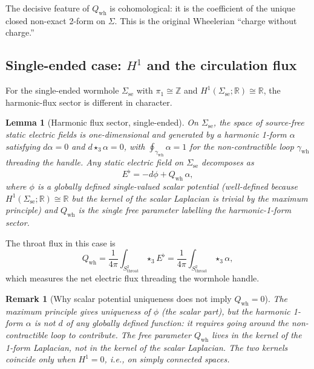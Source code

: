 \documentclass[aps,prd,onecolumn,nofootinbib,superscriptaddress]{revtex4-2}
\newtheorem{lemma}{Lemma}
\newtheorem{remark}{Remark}
\begin{document}
The decisive feature of $Q_{\mathrm{wh}}$ is cohomological: it is the
coefficient of the unique closed non-exact 2-form on $\Sigma$.  This is the
original Wheelerian ``charge without charge.''~\cite{MisnerWheeler1957ClassicalPhysics,Wheeler1962Geometrodynamics}

\subsection{Single-ended case: \texorpdfstring{$H^1$}{H1} and the
circulation flux}

For the single-ended wormhole $\Sigma_{\mathrm{se}}$ with
$\pi_1\cong\mathbb{Z}$ and $H^1(\Sigma_{\mathrm{se}};\mathbb{R})\cong\mathbb{R}$,
the harmonic-flux sector is different in character.

\begin{lemma}[Harmonic flux sector, single-ended]
\label{lem:single-ended-sector}
On $\Sigma_{\mathrm{se}}$, the space of source-free static electric fields is
one-dimensional and generated by a harmonic 1-form $\alpha$ satisfying
$d\alpha=0$ and $d\star_3\alpha=0$, with
$\oint_{\gamma_{\mathrm{wh}}}\alpha = 1$ for the non-contractible loop
$\gamma_{\mathrm{wh}}$ threading the handle.  Any static electric field on
$\Sigma_{\mathrm{se}}$ decomposes as
\begin{equation}
  E^\flat = -d\phi + Q_{\mathrm{wh}}\,\alpha,
\end{equation}
where $\phi$ is a globally defined single-valued scalar potential (well-defined
because $H^1(\Sigma_{\mathrm{se}};\mathbb{R})\cong\mathbb{R}$ but the kernel of
the scalar Laplacian is trivial by the maximum principle) and $Q_{\mathrm{wh}}$
is the single free parameter labelling the harmonic-1-form sector.
\end{lemma}

The throat flux in this case is
\begin{equation}
  Q_{\mathrm{wh}} = \frac{1}{4\pi}\int_{S^2_{\mathrm{throat}}}\star_3 E^\flat
  = \frac{1}{4\pi}\int_{S^2_{\mathrm{throat}}}\star_3\alpha,
\end{equation}
which measures the net electric flux threading the wormhole handle.

\begin{remark}[Why scalar potential uniqueness does not imply $Q_{\mathrm{wh}}=0$]
The maximum principle gives uniqueness of $\phi$ (the scalar part), but the
harmonic 1-form $\alpha$ is not $d$ of any globally defined function: it
requires going around the non-contractible loop to contribute.  The free
parameter $Q_{\mathrm{wh}}$ lives in the kernel of the 1-form Laplacian, not
in the kernel of the scalar Laplacian.  The two kernels coincide only when
$H^1=0$, i.e., on simply connected spaces.
\end{remark}
\end{document}
